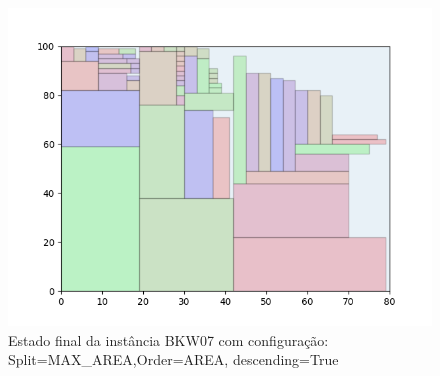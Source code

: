 \begin{figure}[H]
    \centering
    \caption[]{Estado final da instância BKW07 com configuração: Split=MAX_AREA,Order=AREA, descending=True}
    \label{fig:bkw07-max_area-area-true}
    \includegraphics[scale=0.5]{output/figures/bkw/bkw07/max_area/area/true/00}
\end{figure}